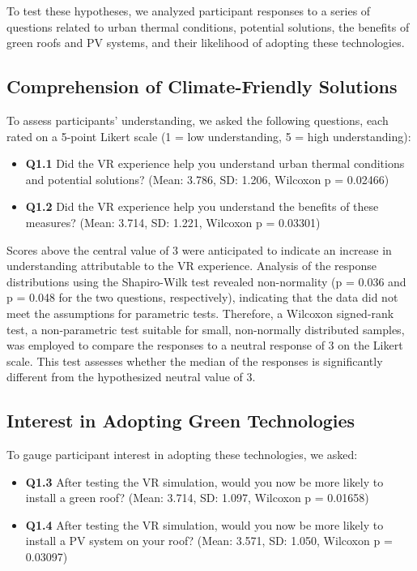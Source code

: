 \documentclass[draft, final]{vutinfth} %
\begin{document}
To test these hypotheses, we analyzed participant responses to a series of questions related to urban thermal conditions, potential solutions, the benefits of green roofs and PV systems, and their likelihood of adopting these technologies. 

\subsection{Comprehension of Climate-Friendly Solutions}

To assess participants' understanding, we asked the following questions, each rated on a 5-point Likert scale (1 = low understanding, 5 = high understanding):

\begin{itemize}
    \item \textbf{Q1.1} Did the VR experience help you understand urban thermal conditions and potential solutions? (Mean: 3.786, SD: 1.206, Wilcoxon p = 0.02466)
    \item \textbf{Q1.2} Did the VR experience help you understand the benefits of these measures? (Mean: 3.714, SD: 1.221, Wilcoxon p = 0.03301)
\end{itemize}

Scores above the central value of 3 were anticipated to indicate an increase in understanding attributable to the VR experience. Analysis of the response distributions using the Shapiro-Wilk test revealed non-normality (p = 0.036 and p = 0.048 for the two questions, respectively), indicating that the data did not meet the assumptions for parametric tests. Therefore, a Wilcoxon signed-rank test, a non-parametric test suitable for small, non-normally distributed samples, was employed to compare the responses to a neutral response of 3 on the Likert scale. This test assesses whether the median of the responses is significantly different from the hypothesized neutral value of 3.

\subsection{Interest in Adopting Green Technologies}

To gauge participant interest in adopting these technologies, we asked:

\begin{itemize}
    \item \textbf{Q1.3} After testing the VR simulation, would you now be more likely to install a green roof? (Mean: 3.714, SD: 1.097, Wilcoxon p = 0.01658)
    \item \textbf{Q1.4} After testing the VR simulation, would you now be more likely to install a PV system on your roof? (Mean: 3.571, SD: 1.050, Wilcoxon p = 0.03097)
\end{itemize}
\end{document}
